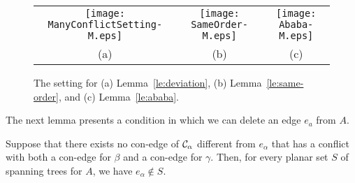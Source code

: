 \documentclass[letter,runningheads]{llncs}
\begin{document}
\begin{figure}[tb]
\begin{center}
\begin{tabular}{c c c}
\mbox{\texttt{[image: ManyConflictSetting-M.eps]}} \hspace{1mm} &
\mbox{\texttt{[image: SameOrder-M.eps]}} \hspace{1mm} &
\mbox{\texttt{[image: Ababa-M.eps]}}\\
(a) \hspace{1mm} & (b) \hspace{1mm} & (c)
\end{tabular}
\caption{The setting for (a) Lemma~\ref{le:deviation}, (b) Lemma~\ref{le:same-order}, and (c) Lemma~\ref{le:ababa}.}
\label{fig:many-conflicts}
\end{center}
\end{figure}



The next lemma presents a condition in which we can delete an edge $e_a$ from $A$.

\begin{lemma}[{\sc Simplification 4}]\label{le:deviation}
Suppose that there exists no con-edge of ${\cal C}_{\alpha}$ different from $e_{\alpha}$ that has a conflict with both a con-edge for $\beta$ and a con-edge for $\gamma$. Then, for every planar set $S$ of spanning trees for $A$, we have $e_{\alpha}\notin S$.
\end{lemma}
\end{document}
